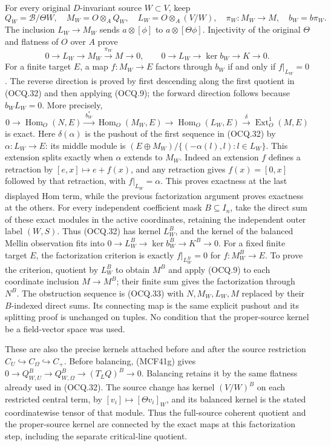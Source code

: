 For every original $D$-invariant source $W\subset V$, keep
\[
 Q_W=\mathscr B/\Theta W,\quad M_W=O\otimes_AQ_W,\quad
 L_W=O\otimes_A(V/W),\quad
 \pi_W:M_W\to M,\quad b_W=b\pi_W.                            \tag{OCQ.31}
\]
The inclusion $L_W\to M_W$ sends $a\otimes[\phi]$ to
$a\otimes[\Theta\phi]$.  Injectivity of the original $\Theta$ and
flatness of $O$ over $A$ prove
\[
 0\to L_W\to M_W\xrightarrow{\pi_W}M\to0,\qquad
 0\to L_W\to\ker b_W\to K\to0.                              \tag{OCQ.32}
\]
For a finite target $E$, a map $f:M_W\to E$ factors through $b_W$
if and only if $f|_{L_W}=0$.  The reverse direction is proved by first
descending along the first quotient in (OCQ.32) and then applying
(OCQ.9); the forward direction follows because $b_WL_W=0$.
More precisely,
\[
 0\to\operatorname{Hom}_O(N,E)\xrightarrow{\ b_W^*\ }
 \operatorname{Hom}_O(M_W,E)\longrightarrow
 \operatorname{Hom}_O(L_W,E)\xrightarrow\delta
 \operatorname{Ext}^1_O(M,E)                                \tag{OCQ.33}
\]
is exact.  Here $\delta(\alpha)$ is the pushout of the first sequence
in (OCQ.32) by $\alpha:L_W\to E$: its middle module is
$(E\oplus M_W)/\{(-\alpha(l),l):l\in L_W\}$.
This extension splits exactly when $\alpha$ extends to $M_W$.
Indeed an extension $f$ defines a retraction by
$[e,x]\mapsto e+f(x)$, and any retraction gives $f(x)=[0,x]$
followed by that retraction, with $f|_{L_W}=\alpha$.
This proves exactness at the last displayed Hom term, while the
previous factorization argument proves exactness at the others.
For every independent coefficient mask $B\subseteq I_n$, take
the direct sum of these exact modules in the active coordinates,
retaining the independent outer label $(W,S)$. Thus (OCQ.32) has
kernel $L_W^B$, and the kernel of the balanced Mellin observation
fits into $0\to L_W^B\to\ker b_W^B\to K^B\to0$.
For a fixed finite target $E$, the factorization criterion is exactly
$f|_{L_W^B}=0$ for $f:M_W^B\to E$. To prove the criterion,
quotient by $L_W^B$ to obtain $M^B$ and apply (OCQ.9) to each
coordinate inclusion $M\to M^B$; their finite sum gives the
factorization through $N^B$. The obstruction sequence is (OCQ.33)
with $N,M_W,L_W,M$ replaced by their $B$-indexed direct sums.
Its connecting map is the same explicit pushout and its splitting
proof is unchanged on tuples. No condition that the proper-source
kernel be a field-vector space was used.

These are also the precise kernels attached before and after the
source restriction $C_U\hookrightarrow C_\Omega\hookrightarrow
C_+$. Before balancing, (MCF41g) gives
$0\to Q_{W,U}^B\to Q_{W,\Omega}^B\to(T_LQ)^B\to0$.
Balancing retains it by the same flatness already used in (OCQ.32).
The source change has kernel $(V/W)^B$ on each restricted central
term, by $[v_i]\mapsto[\Theta v_i]_W$, and its balanced kernel
is the stated coordinatewise tensor of that module. Thus the
full-source coherent quotient and the proper-source kernel are
connected by the exact maps at this factorization step, including
the separate critical-line quotient.

